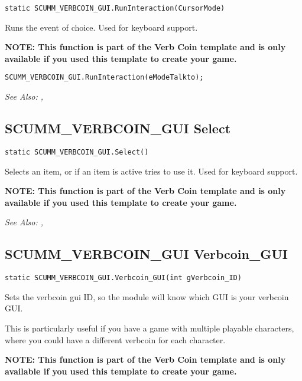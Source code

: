 \begin{verbatim}
static SCUMM_VERBCOIN_GUI.RunInteraction(CursorMode)
\end{verbatim}
Runs the event of choice. Used for keyboard support.

\bf{NOTE:} This function is part of the Verb Coin template and is only available if
you used this template to create your game.

\begin{verbatim}
SCUMM_VERBCOIN_GUI.RunInteraction(eModeTalkto);
\end{verbatim}

\it{See Also:} ,


\subsection{SCUMM_VERBCOIN_GUI Select}\label{SCUMM_VERBCOIN_GUI.Select}%

\begin{verbatim}
static SCUMM_VERBCOIN_GUI.Select()
\end{verbatim}
Selects an item, or if an item is active tries to use it. Used for keyboard support.

\bf{NOTE:} This function is part of the Verb Coin template and is only available if
you used this template to create your game.

\it{See Also:} ,


\subsection{SCUMM_VERBCOIN_GUI Verbcoin_GUI}\label{SCUMM_VERBCOIN_GUI.Verbcoin_GUI}%

\begin{verbatim}
static SCUMM_VERBCOIN_GUI.Verbcoin_GUI(int gVerbcoin_ID)
\end{verbatim}
Sets the verbcoin gui ID, so the module will know which GUI is your verbcoin GUI.

This is particularly useful if you have a game with multiple playable characters,
where you could have a different verbcoin for each character.

\bf{NOTE:} This function is part of the Verb Coin template and is only available if
you used this template to create your game.

